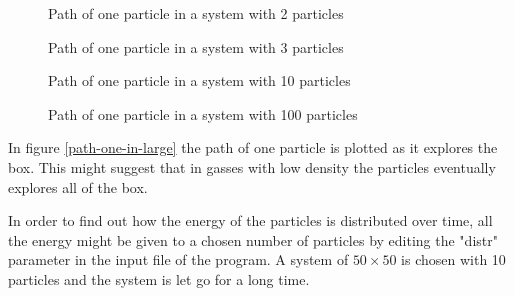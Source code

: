 \documentclass[10pt,a4paper,aps,twocolumn,secnumarabic,numerical,balancelastpage,nofootinbib,superscriptaddress]{revtex4-2}
\begin{document}
		\begin{figure*}[htb]
			\centering
			\begin{subfigure}{.45\textwidth}
				\hspace*{-2.6cm}\scalebox{0.9}{}
				\caption{Path of one particle in a system with 2 particles}
			\end{subfigure}
			\begin{subfigure}{.45\textwidth}
				\hspace*{-2.6cm}\scalebox{0.9}{}
				\caption{Path of one particle in a system with 3 particles}
			\end{subfigure}
			\begin{subfigure}{.45\textwidth}
				\hspace*{-2.6cm}\scalebox{0.9}{}
				\caption{Path of one particle in a system with 10 particles}
			\end{subfigure}
			\begin{subfigure}{.45\textwidth}
				\hspace*{-2.6cm}\scalebox{0.9}{}
				\caption{Path of one particle in a system with 100 particles}
			\end{subfigure}
			\caption{\label{path-one-in-large}Path of one particle in large system}
		\end{figure*}
		In figure \ref{path-one-in-large} the path of one particle is plotted as it explores the box. This might suggest that in gasses with low density the particles eventually explores all of the box. 
		
		In order to find out how the energy of the particles is distributed over time, all the energy might be given to a chosen number of particles by editing the "distr" parameter in the input file of the program. A system of $50\times50$ is chosen with 10 particles and the system is let go for a long time.
			
\end{document}
